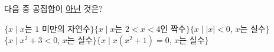 다음 중 공집합이 \underline{아닌} 것은?
\begin{choicesv}{$\{x \mid x$는 $1$ 미만의 자연수$\}$}{$\{x \mid x$는 $2<x<4$인 짝수$\}$}{$\{x \mid |x|<0$, $x$는 실수$\}$}{$\{x \mid x^2+3<0$, $x$는 실수$\}$}{$\{x \mid x(x^2+1)=0$, $x$는 실수$\}$}\end{choicesv}

